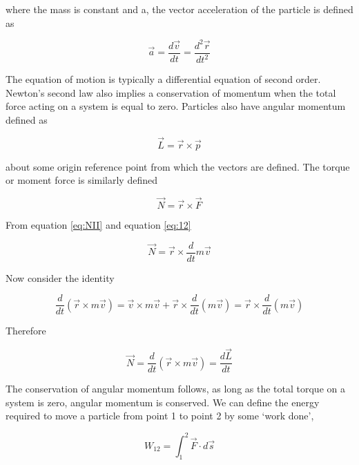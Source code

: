 \documentclass{tufte-book}
\begin{document}
where the mass is constant and a, the vector acceleration of the particle is defined as

\begin{equation}
	\label{eq:14}
	\vec{a} = \frac{d\vec{v}}{dt} = \frac{d^2\vec{r}}{dt^2}
\end{equation}

The equation of motion is typically a differential equation of second order. Newton's second law also implies a conservation of momentum when the total force acting on a system is equal to zero. Particles also have angular momentum defined as

\begin{equation}
	\label{eq:15}
	\vec{L} = \vec{r} \times \vec{p}
\end{equation}

about some origin reference point from which the vectors are defined. The torque or moment force is similarly defined

\begin{equation}
	\label{eq:16}
	\vec{N} = \vec{r} \times \vec{F}
\end{equation}

From equation \ref{eq:NII} and equation \ref{eq:12}

\begin{equation}
	\label{eq:17}
	\vec{N} = \vec{r} \times \frac{d}{dt}m\vec{v}
\end{equation}

Now consider the identity

\begin{equation}
	\label{eq:18}
	\frac{d}{dt}(\vec{r}\times m\vec{v}) = \vec{v}\times m\vec{v} + \vec{r}\times\frac{d}{dt}(m\vec{v}) = \vec{r}\times\frac{d}{dt}(m\vec{v})
\end{equation}

Therefore

\begin{equation}
	\label{eq:19}
	\vec{N} = \frac{d}{dt}(\vec{r} \times m\vec{v}) = \frac{d\vec{L}}{dt}
\end{equation}

The conservation of angular momentum follows, as long as the total torque on a system is zero, angular momentum is conserved. We can define the energy required to move a particle from point 1 to point 2 by some `work done',

\begin{equation}
	\label{eq:20}
	W_{12} = \int^2_1 \vec{F}\cdot d\vec{s}
\end{equation}
\end{document}
